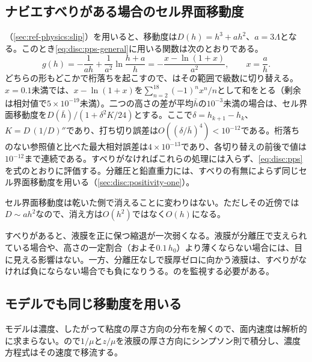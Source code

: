 \subsection{ナビエすべりがある場合のセル界面移動度}
\label{sec:disc:positivity-slip}

（\cref{sec:ref-physics:slip}）を用いると、移動度は$D(h) = h^{3} + a h^{2}$、$a = 3\Lambda$となる。このとき\cref{eq:disc:pps-general}に用いる関数は次のとおりである。
%
\begin{equation}
  g(h) = -\frac{1}{a h} + \frac{1}{a^{2}}\ln\frac{h+a}{h}
       = -\frac{x - \ln(1+x)}{a^{2}}, \qquad x = \frac{a}{h} .
  \label{eq:disc:pps-slip}
\end{equation}
%
どちらの形もどこかで桁落ちを起こすので、はその範囲で級数に切り替える。$x = 0.1$未満では、$x - \ln(1+x)$を$\sum_{n=2}^{18}(-1)^n x^n/n$として和をとる（剰余は相対値で$5\times10^{-19}$未満）。二つの高さの差が平均$\bar h$の$10^{-3}$未満の場合は、セル界面移動度を$D(\bar h)/(1 + \delta^{2}K/24)$とする。ここで$\delta = h_{k+1} - h_k$、$K = D\,(1/D)''$であり、打ち切り誤差は$O((\delta/\bar h)^4) < 10^{-12}$である。桁落ちのない参照値と比べた最大相対誤差は$4\times10^{-13}$であり、各切り替えの前後で値は$10^{-12}$まで連続である。すべりがなければこれらの処理には入らず、\cref{eq:disc:pps}を式のとおりに評価する。分離圧と鉛直重力には、すべりの有無によらず同じセル界面移動度を用いる（\cref{sec:disc:positivity-one}）。

セル界面移動度は乾いた側で消えることに変わりはない。ただしその近傍では$D \sim a h^{2}$なので、消え方は$O(h^{2})$ではなく$O(h)$になる。

\begin{warn}[すべりは正値性の保証を弱める]
すべりがあると、液膜を正に保つ縮退が一次弱くなる。液膜が分離圧で支えられている場合や、高さの一定割合（およそ$0.1\,h_0$）より薄くならない場合には、目に見える影響はない。一方、分離圧なしで膜厚ゼロに向かう液膜は、すべりがなければ負にならない場合でも負になりうる。のを監視する必要がある。
\end{warn}

\subsection{\texorpdfstring{}{CZ}モデルでも同じ移動度を用いる}
\label{sec:disc:positivity-concz}

モデルは濃度、したがって粘度の厚さ方向の分布を解くので、面内速度は解析的に求まらない。ので$1/\mu$と$z/\mu$を液膜の厚さ方向にシンプソン則で積分し、濃度方程式はその速度で移流する。

